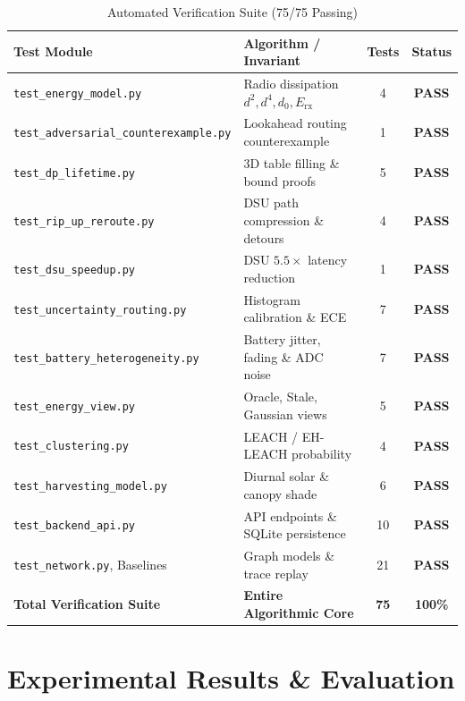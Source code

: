 \documentclass[conference]{IEEEtran}
\begin{document}
\begin{table}[!t]
\caption{Automated Verification Suite (75/75 Passing)}
\label{tab:pytest}
\centering
\begin{tabular}{@{}llcc@{}}
\toprule
\textbf{Test Module} & \textbf{Algorithm / Invariant} & \textbf{Tests} & \textbf{Status} \\
\midrule
\texttt{test\_energy\_model.py} & Radio dissipation $d^2, d^4, d_0, E_{\text{rx}}$ & 4 & \textbf{PASS} \\
\texttt{test\_adversarial\_counterexample.py} & Lookahead routing counterexample & 1 & \textbf{PASS} \\
\texttt{test\_dp\_lifetime.py} & 3D table filling \& bound proofs & 5 & \textbf{PASS} \\
\texttt{test\_rip\_up\_reroute.py} & DSU path compression \& detours & 4 & \textbf{PASS} \\
\texttt{test\_dsu\_speedup.py} & DSU $5.5\times$ latency reduction & 1 & \textbf{PASS} \\
\texttt{test\_uncertainty\_routing.py} & Histogram calibration \& ECE & 7 & \textbf{PASS} \\
\texttt{test\_battery\_heterogeneity.py} & Battery jitter, fading \& ADC noise & 7 & \textbf{PASS} \\
\texttt{test\_energy\_view.py} & Oracle, Stale, Gaussian views & 5 & \textbf{PASS} \\
\texttt{test\_clustering.py} & LEACH / EH-LEACH probability & 4 & \textbf{PASS} \\
\texttt{test\_harvesting\_model.py} & Diurnal solar \& canopy shade & 6 & \textbf{PASS} \\
\texttt{test\_backend\_api.py} & API endpoints \& SQLite persistence & 10 & \textbf{PASS} \\
\texttt{test\_network.py}, Baselines & Graph models \& trace replay & 21 & \textbf{PASS} \\
\midrule
\textbf{Total Verification Suite} & \textbf{Entire Algorithmic Core} & \textbf{75} & \textbf{100\%} \\
\bottomrule
\end{tabular}
\end{table}

\section{Experimental Results \& Evaluation}
\end{document}
